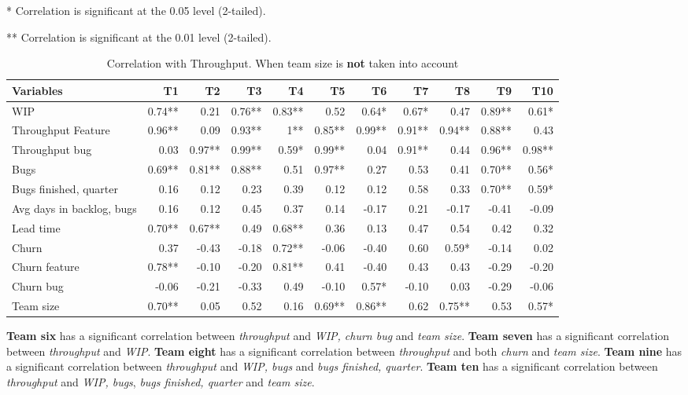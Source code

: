 \documentclass[UKenglish]{ifimaster}  %
\begin{document}
\begin{table}[!htbp]
 \caption{Correlation with Throughput. When team size is \textbf{not} taken into account}
 \centerline {* Correlation is significant at the 0.05 level (2-tailed).}
\centerline{** Correlation is significant at the 0.01 level (2-tailed).}
 \begin{adjustwidth}{-1cm}{}
 \centering
 \begin{tabular}{|l|r|r|r|r|r|r|r|r|r|r|}
\hline
 \textbf{Variables} & \bf{T1} & \bf{T2} & \bf{T3} & \bf{T4} & \bf{T5} & \bf{T6} & \bf{T7} & \bf{T8} & \bf{T9} & \bf{T10}\\ \hline
 WIP   & 0.74** & 0.21 & 0.76** & 0.83** & 0.52 & 0.64* & 0.67* & 0.47 & 0.89** & 0.61* \\ \hline
 Throughput Feature   & 0.96** & 0.09 & 0.93** & 1** & 0.85** & 0.99** & 0.91** & 0.94** & 0.88** & 0.43 \\ \hline
 Throughput bug   & 0.03 & 0.97** & 0.99** & 0.59* & 0.99** & 0.04 & 0.91** & 0.44 & 0.96** & 0.98** \\ \hline
 Bugs   & 0.69** & 0.81** & 0.88** & 0.51 & 0.97** & 0.27 & 0.53 & 0.41 & 0.70** & 0.56* \\ \hline
 Bugs finished, quarter   & 0.16 & 0.12 & 0.23 & 0.39 & 0.12 & 0.12 & 0.58 & 0.33 & 0.70** & 0.59* \\ \hline
 Avg days in backlog, bugs   & 0.16 & 0.12 & 0.45 & 0.37 & 0.14 & -0.17 & 0.21 & -0.17 & -0.41 & -0.09 \\ \hline
 Lead time   & 0.70** & 0.67** & 0.49 & 0.68** & 0.36 & 0.13 & 0.47 & 0.54 & 0.42 & 0.32 \\ \hline
 Churn   & 0.37 & -0.43 & -0.18 & 0.72** & -0.06 & -0.40 & 0.60 & 0.59* & -0.14 & 0.02 \\ \hline
 Churn feature   & 0.78** & -0.10 & -0.20 & 0.81** & 0.41 & -0.40 & 0.43 & 0.43 & -0.29 & -0.20 \\ \hline
 Churn bug   & -0.06 & -0.21 & -0.33 & 0.49 & -0.10 & 0.57* & -0.10 & 0.03 & -0.29 & -0.06 \\ \hline
 Team size   & 0.70** & 0.05 & 0.52 & 0.16 & 0.69** & 0.86** & 0.62 & 0.75** & 0.53 & 0.57* \\ \hline
\end{tabular}
 \label{corr:TP}

\end{adjustwidth}
\end{table}


\textbf{Team six} has a significant correlation between \textit{throughput} and \textit{WIP, churn bug} and \textit{team size}. \textbf{Team seven} has a significant correlation between \textit{throughput} and \textit{WIP}. \textbf{Team eight} has a significant correlation between \textit{throughput} and both \textit{churn} and \textit{team size}. \textbf{Team nine} has a significant correlation between \textit{throughput} and \textit{WIP, bugs} and \textit{bugs finished, quarter}. \textbf{Team ten} has a significant correlation between \textit{throughput} and \textit{WIP, bugs}, \textit{bugs finished, quarter} and \textit{team size}. 
\end{document}
